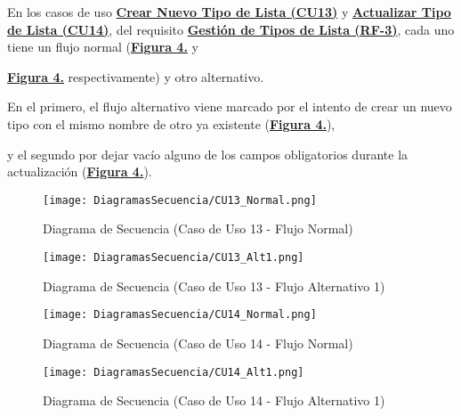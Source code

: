 \addtocounter{figura_cap4}{1}
En los casos de uso \textbf{\hyperref[tab:curCrearTipoLst]{Crear Nuevo Tipo de Lista (CU13)}} y \textbf{\hyperref[tab:curActualizarTipoLst]{Actualizar Tipo de Lista (CU14)}}, del requisito \textbf{\hyperref[tab:rfGestTipoLst]{Gestión de Tipos de Lista (RF-3)}}, cada uno tiene un flujo normal (\textbf{\hyperref[fig:Secuencia_CU13_Normal]{Figura 4.}} y\addtocounter{figura_cap4}{1} \textbf{\hyperref[fig:Secuencia_CU14_Normal]{Figura 4.}} respectivamente) y otro alternativo.\addtocounter{figura_cap4}{1} En el primero, el flujo alternativo viene marcado por el intento de crear un nuevo tipo con el mismo nombre de otro ya existente (\textbf{\hyperref[fig:Secuencia_CU13_Alt1]{Figura 4.}}),\addtocounter{figura_cap4}{1} y el segundo por dejar vacío alguno de los campos obligatorios durante la actualización (\textbf{\hyperref[fig:Secuencia_CU14_Alt1]{Figura 4.}}).

\begin{landscape}
  \begin{figure}[!htbp]
    \centering
    \texttt{[image: DiagramasSecuencia/CU13\_Normal.png]}
    \caption{Diagrama de Secuencia (Caso de Uso 13 - Flujo Normal)}
    \label{fig:Secuencia_CU13_Normal}
  \end{figure}
\end{landscape}
\FloatBarrier

\begin{landscape}
  \begin{figure}[!htbp]
    \centering
    \texttt{[image: DiagramasSecuencia/CU13\_Alt1.png]}
    \caption{Diagrama de Secuencia (Caso de Uso 13 - Flujo Alternativo 1)}
    \label{fig:Secuencia_CU13_Alt1}
  \end{figure}
\end{landscape}
\FloatBarrier

\begin{landscape}
  \begin{figure}[!htbp]
    \centering
    \texttt{[image: DiagramasSecuencia/CU14\_Normal.png]}
    \caption{Diagrama de Secuencia (Caso de Uso 14 - Flujo Normal)}
    \label{fig:Secuencia_CU14_Normal}
  \end{figure}
\end{landscape}
\FloatBarrier

\begin{landscape}
  \begin{figure}[!htbp]
    \centering
    \texttt{[image: DiagramasSecuencia/CU14\_Alt1.png]}
    \caption{Diagrama de Secuencia (Caso de Uso 14 - Flujo Alternativo 1)}
    \label{fig:Secuencia_CU14_Alt1}
  \end{figure}
\end{landscape}
\FloatBarrier


